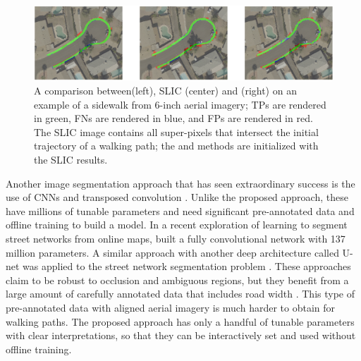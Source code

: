 \begin{figure}[tb]
    \centering
    \includegraphics[width=0.95\columnwidth]{Figures/compare.png}
    \caption[Method comparison with \GrabCut{}, Active Contours, and \ac{SLIC}]{
        A comparison between\GrabCut{}(left), \ac{SLIC} (center) and \ActiveContours{} (right) 
        on an example of a sidewalk from 6-inch aerial imagery; 
        \aclp{TP} are rendered in green, 
        \aclp{FN} are rendered in blue, and 
        \aclp{FP} are rendered in red.  The \ac{SLIC} image contains all super-pixels that intersect the initial trajectory of a walking path; the \ActiveContours{} and \GrabCut{} methods are initialized with the \ac{SLIC} results.  
    }
    \label{fig:Method_comparison}
\end{figure}



Another image segmentation approach that has seen extraordinary success is the use of \acp{CNN} and transposed convolution \cite{Ronneberger2015-sv, Shelhamer2017-rf, Noh2015-ni, Badrinarayanan2017-il}. Unlike the proposed approach, these have millions of tunable parameters and need significant pre-annotated data and offline training to build a model. In a recent exploration of learning to segment street networks from online maps, \cite{Kaiser2017-np} built a fully convolutional network with 137 million parameters. A similar approach with another deep architecture called U-net \cite{Ronneberger2015-sv} was applied to the street network segmentation problem \cite{Zhang2017-gi}. These approaches claim to be robust to occlusion and ambiguous regions, but they benefit from a large amount of carefully annotated data that includes road width \cite{Mnih2013-dp}. This type of pre-annotated data with aligned aerial imagery is much harder to obtain for walking paths.  The proposed approach has only a handful of tunable parameters with clear interpretations, so that they can be interactively set and used without offline training.

